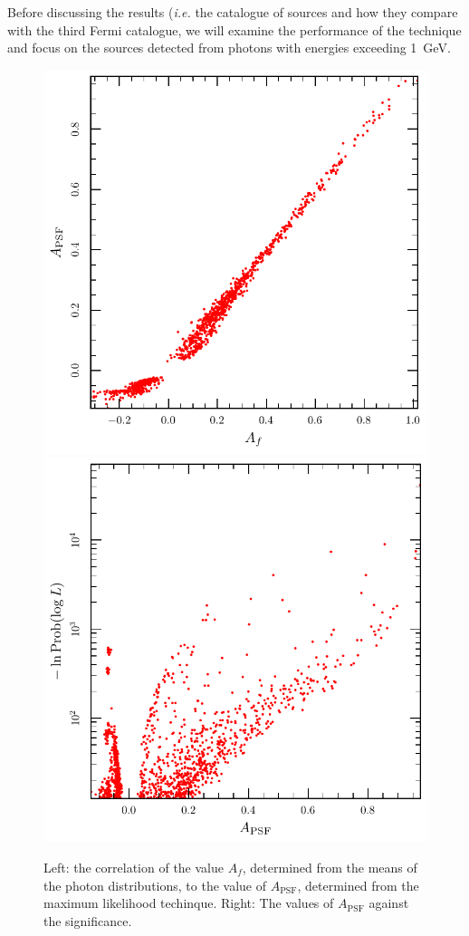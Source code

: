 \documentclass[useAMS,usenatbib]{mn2e}
\begin{document}
Before discussing the results ({\em i.e.} the catalogue of sources and
how they compare with the third Fermi catalogue, we will examine the
performance of the technique and focus on the sources detected from
photons with energies exceeding 1~GeV.
\begin{figure}
  \includegraphics[width=\columnwidth]{acorr}
  \includegraphics[width=\columnwidth]{asigcorr}
  \caption{Left: the correlation of the value $A_f$, determined from
    the means of the photon distributions, to the value of
    $A_\mathrm{PSF}$, determined from the maximum likelihood
    techinque.  Right: The values of $A_\mathrm{PSF}$ against the
    significance.}
  \label{fig:acorr}
\end{figure}
\end{document}
